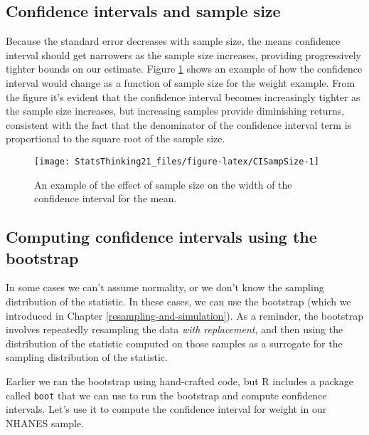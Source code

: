 \documentclass[]{book}
\theoremstyle{definition}
\theoremstyle{definition}
\theoremstyle{definition}
\theoremstyle{remark}
\begin{document}
\subsection{Confidence intervals and sample
size}\label{confidence-intervals-and-sample-size}

Because the standard error decreases with sample size, the means
confidence interval should get narrowers as the sample size increases,
providing progressively tighter bounds on our estimate. Figure
\ref{fig:CISampSize} shows an example of how the confidence interval
would change as a function of sample size for the weight example. From
the figure it's evident that the confidence interval becomes
increasingly tighter as the sample size increases, but increasing
samples provide diminishing returns, consistent with the fact that the
denominator of the confidence interval term is proportional to the
square root of the sample size.

\begin{figure}
\texttt{[image: StatsThinking21\_files/figure-latex/CISampSize-1]} \caption{An example of the effect of sample size on the width of the confidence interval for the mean.}\label{fig:CISampSize}
\end{figure}

\subsection{Computing confidence intervals using the
bootstrap}\label{computing-confidence-intervals-using-the-bootstrap}

In some cases we can't assume normality, or we don't know the sampling
distribution of the statistic. In these cases, we can use the bootstrap
(which we introduced in Chapter \ref{resampling-and-simulation}). As a
reminder, the bootstrap involves repeatedly resampling the data
\emph{with replacement}, and then using the distribution of the
statistic computed on those samples as a surrogate for the sampling
distribution of the statistic.

Earlier we ran the bootstrap using hand-crafted code, but R includes a
package called \texttt{boot} that we can use to run the bootstrap and
compute confidence intervals. Let's use it to compute the confidence
interval for weight in our NHANES sample.
\end{document}
